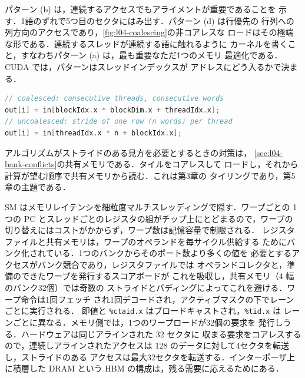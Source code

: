\documentclass[../main.tex]{subfiles}
\begin{document}
パターン (b) は，連続するアクセスでもアライメントが重要であることを
示す．1語のずれで5つ目のセクタにはみ出す．パターン (d) は行優先の
行列への列方向のアクセスであり，\cref{fig:l04-coalescing}の非コアレスな
ロードはその極端な形である．連続するスレッドが連続する語に触れるように
カーネルを書くこと，すなわちパターン (a) は，最も重要なただ1つのメモリ
最適化である．CUDA では，パターンはスレッドインデックスが
アドレスにどう入るかで決まる．
\begin{lstlisting}[language=C++, numbers=none]
// coalesced: consecutive threads, consecutive words
out[i] = in[blockIdx.x * blockDim.x + threadIdx.x];
// uncoalesced: stride of one row (n words) per thread
out[i] = in[threadIdx.x * n + blockIdx.x];
\end{lstlisting}
アルゴリズムがストライドのある見方を必要とするときの対策は，
\cref{sec:l04-bank-conflicts}の共有メモリである．タイルをコアレスして
ロードし，それから計算が望む順序で共有メモリから読む．これは第3章の
タイリングであり，第5章の主題である．

\begin{keypoint}[章のまとめ]
  SM はメモリレイテンシを細粒度マルチスレッディングで隠す．ワープごとの
  1つの PC とスレッドごとのレジスタの組がチップ上にとどまるので，ワープの
  切り替えにはコストがかからず，ワープ数は記憶容量で制限される．
  レジスタファイルと共有メモリは，ワープのオペランドを毎サイクル供給する
  ためにバンク化されている．1つのバンクからそのポート数より多くの値を
  必要とするアクセスがバンク競合であり，レジスタファイルでは
  オペランドコレクタと，準備のできたワープを発行するスコアボードが
  これを吸収し，共有メモリ（\SI{4}{\byte} 幅のバンク32個）では奇数の
  ストライドとパディングによってこれを避ける．ワープ命令は1回フェッチ
  され1回デコードされ，アクティブマスクの下でレーンごとに実行される．
  即値と \texttt{\%ctaid.x} はブロードキャストされ，\texttt{\%tid.x} は
  レーンごとに異なる．メモリ側では，1つのワープロードが32個の要求を
  発行しうる．ハードウェアは同じアラインされた \SI{32}{\byte} セクタに
  収まる要求をコアレスするので，連続しアラインされたアクセスは
  \SI{128}{\byte} のデータに対して4セクタを転送し，ストライドのある
  アクセスは最大32セクタを転送する．インターポーザ上に積層した DRAM
  という HBM の構成は，残る需要に応えるためにある．
\end{keypoint}
\end{document}
